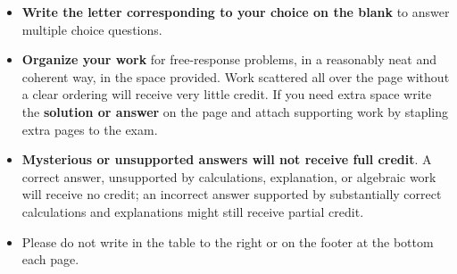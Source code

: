 \documentclass[11pt]{exam}
\begin{document}
\begin{minipage}[t]{3.7in}
\vspace{0pt}
\begin{itemize}

\item \textbf{Write the letter corresponding to your choice on the blank} to answer multiple choice questions.

\item \textbf{Organize your work} for free-response problems, in a reasonably neat and coherent way, in
the space provided. Work scattered all over the page without a clear ordering will 
receive very little credit. If you need extra space write the \textbf{solution or answer} on the page and attach supporting work by stapling extra pages to the exam.

\item \textbf{Mysterious or unsupported answers will not receive full
credit}.  A correct answer, unsupported by calculations, explanation,
or algebraic work will receive no credit; an incorrect answer supported
by substantially correct calculations and explanations might still receive
partial credit.

\item Please do not write in the table to the right or on the footer at the bottom each page.
\end{itemize}


\end{minipage}
\hfill
\begin{minipage}[t]{2.3in}
\vspace{0pt}
\addpoints %
\gradetable[v][pages]%

\end{minipage}
\newpage %

%
%
%
\end{document}
